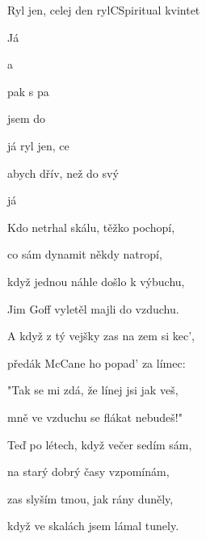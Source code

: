 \begin{song}{Ryl jen, celej den ryl}{C}{Spiritual kvintet}
\begin{SBVerse}
Já 

a 

pak s pa

jsem do
\end{SBVerse}
\begin{SBChorus}
  já ryl jen, ce

abych dřív, než do svý 

  

já 


\Ch{$|$:}{}     \Ch{:$|$}{}

\end{SBChorus}
\begin{SBVerse}
Kdo netrhal skálu, těžko pochopí,

co sám dynamit někdy natropí,

když jednou náhle došlo k výbuchu,

Jim Goff vyletěl majli do vzduchu.
\end{SBVerse}
\begin{SBVerse}
A když z tý vejšky zas na zem si kec',

předák McCane ho popad' za límec:

"Tak se mi zdá, že línej jsi jak veš,

mně ve vzduchu se flákat nebudeš!"
\end{SBVerse}
\begin{SBVerse}
Teď po létech, když večer sedím sám,

na starý dobrý časy vzpomínám,

zas slyším tmou, jak rány duněly,

když ve skalách jsem lámal tunely.
\end{SBVerse}
\end{song}

\pagebreak